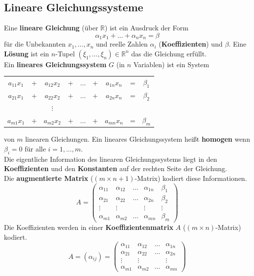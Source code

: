 \documentclass[12pt]{article}
\begin{document}
\subsection{Lineare Gleichungssysteme}
Eine \textbf{lineare Gleichung} (über $\mathbb{R}$) ist ein Ausdruck der Form
\[\alpha_1x_1 + \dots + \alpha_nx_n = \beta\]
für die Unbekannten $x_1, \dots, x_n$ und reelle Zahlen $\alpha_i$ (\textbf{Koeffizienten}) und $\beta$. Eine \textbf{Lösung} ist ein $n$-Tupel $(\xi_1, \dots, \xi_n) \in \mathbb{R}^n$ das die Gleichung erfüllt. \\
\newline
Ein \textbf{lineares Gleichungssystem} $G$ (in $n$ Variablen) ist ein System \\
\begin{center}
    \begin{tabular}{c c c c c c c c c}
        $a_{11}x_1$ & + & $a_{12}x_2$ & + & $\dots$ & + & $a_{1n}x_n$ & = & $\beta_1$ \\ 
        $a_{21}x_1$ & + & $a_{22}x_2$ & + & $\dots$ & + & $a_{2n}x_n$ & = & $\beta_2$ \\ 
        & & $\vdots$ & & & & \\
        $a_{m1}x_1$ & + & $a_{m2}x_2$ & + & $\dots$ & + & $a_{mn}x_n$ & = & $\beta_m$ \\ 
    \end{tabular}
\end{center}
von $m$ linearen Gleichungen. Ein lineares Gleichungssystem heißt \textbf{homogen} wenn $\beta_i = 0$ für alle $i=1,\dots,m$. \\
\newline
Die eigentliche Information des linearen Gleichungssystems liegt in den \textbf{Koeffizienten} und den \textbf{Konstanten} auf der rechten Seite der Gleichung. \\
Die \textbf{augmentierte Matrix} ($(m \times n+1)$-Matrix) kodiert diese Informationen.
\[A = \begin{pmatrix}
    
    \alpha_{11} & \alpha_{12} & \dots & \alpha_{1n} & \beta_1 \\
    \alpha_{21} & \alpha_{22} & \dots & \alpha_{2n} & \beta_2 \\
    \vdots & \vdots & & \vdots & \vdots\\
    \alpha_{m1} & \alpha_{m2} & \dots & \alpha_{mn} & \beta_m
\end{pmatrix}\]
Die Koeffizienten werden in einer \textbf{Koeffizientenmatrix} $A$ ($(m \times n)$-Matrix) kodiert.
\[A = (\alpha_{ij}) = \begin{pmatrix}
    \alpha_{11} & \alpha_{12} & \dots & \alpha_{1n} \\
    \alpha_{21} & \alpha_{22} & \dots & \alpha_{2n} \\
    \vdots & \vdots & & \vdots \\
    \alpha_{m1} & \alpha_{m2} & \dots & \alpha_{mn}
\end{pmatrix}\]
\end{document}

